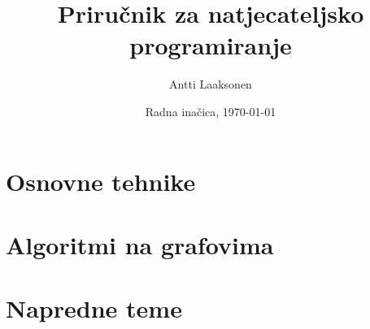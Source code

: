 \documentclass[twoside,12pt,a4paper,croatian]{book}
\date{Radna inačica, \today}
\title{\Huge Priručnik za natjecateljsko programiranje}
\author{\Large Antti Laaksonen}
\begin{document}


\frontmatter
\maketitle
\setcounter{tocdepth}{1}
\tableofcontents



\mainmatter
{}
\setcounter{page}{1}

\newcommand{\key}[1] {\textbf{#1}}

\part{Osnovne tehnike}










\part{Algoritmi na grafovima}










\part{Napredne teme}











\cleardoublepage
{}
{}


\cleardoublepage
\printindex
\end{document}
